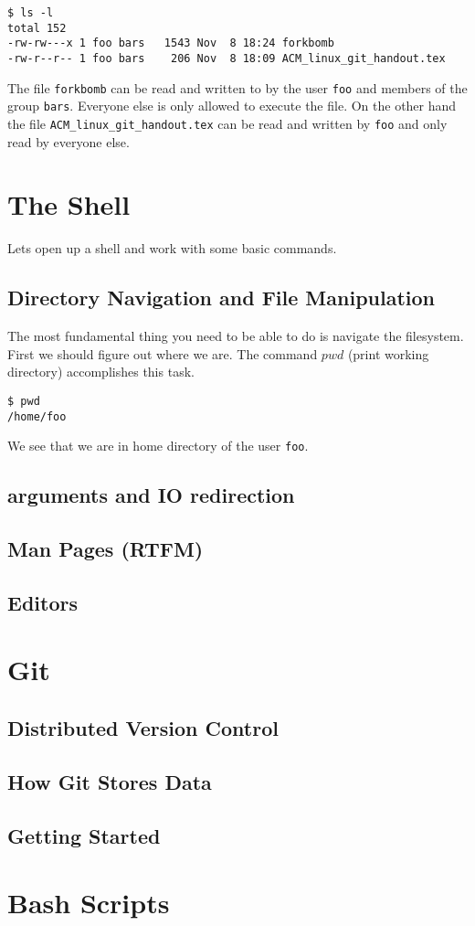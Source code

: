 \documentclass[10pt]{article}
\begin{document}
\begin{verbatim}
$ ls -l
total 152
-rw-rw---x 1 foo bars   1543 Nov  8 18:24 forkbomb
-rw-r--r-- 1 foo bars    206 Nov  8 18:09 ACM_linux_git_handout.tex
\end{verbatim}

  The file \texttt{forkbomb} can be read and written to by the user \texttt{foo} and members of the group \texttt{bars}. Everyone else is only allowed to execute the file. On the other hand the file \texttt{ACM\_linux\_git\_handout.tex} can be read and written by \texttt{foo} and only read by everyone else.
  
  
\section{The Shell}
Lets open up a shell and work with some basic commands.
  \subsection{Directory Navigation and File Manipulation}
  The most fundamental thing you need to be able to do is navigate the filesystem.
  First we should figure out where we are. 
  The command $pwd$ (print working directory) accomplishes this task.

\begin{verbatim}
$ pwd
/home/foo
\end{verbatim}

  We see that we are in home directory of the user \texttt{foo}. 
  
  
  
  
  
  \subsection{arguments and IO redirection}
  \subsection{Man Pages (RTFM)}
  \subsection{Editors}

\section{Git}

  \subsection{Distributed Version Control}
  \subsection{How Git Stores Data}
  \subsection{Getting Started}
  
\section{Bash Scripts}





\end{document}
